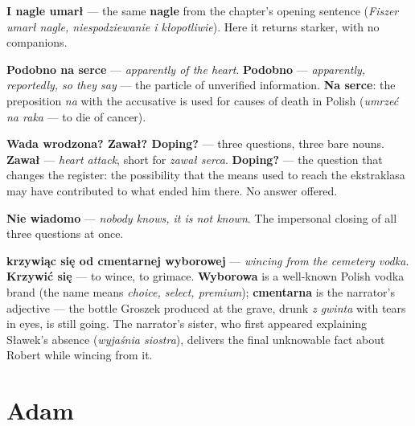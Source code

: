 

\textbf{I nagle umarł} --- the same \textbf{nagle} from the chapter's
opening sentence (\textit{Fiszer umarł nagle, niespodziewanie i
kłopotliwie}). Here it returns starker, with no companions.

\textbf{Podobno na serce} --- \textit{apparently of the heart}.
\textbf{Podobno} --- \textit{apparently, reportedly, so they say} ---
the particle of unverified information. \textbf{Na serce}: the
preposition \textit{na} with the accusative is used for causes of
death in Polish (\textit{umrzeć na raka} --- to die of cancer).

\textbf{Wada wrodzona? Zawał? Doping?} --- three questions, three
bare nouns. \textbf{Zawał} --- \textit{heart attack}, short for
\textit{zawał serca}. \textbf{Doping?} --- the question that changes
the register: the possibility that the means used to reach the
ekstraklasa may have contributed to what ended him there. No answer
offered.

\textbf{Nie wiadomo} --- \textit{nobody knows, it is not known}. The
impersonal closing of all three questions at once.

\textbf{krzywiąc się od cmentarnej wyborowej} --- \textit{wincing
from the cemetery vodka}. \textbf{Krzywić się} --- to wince, to
grimace. \textbf{Wyborowa} is a well-known Polish vodka brand (the
name means \textit{choice, select, premium}); \textbf{cmentarna} is
the narrator's adjective --- the bottle Groszek produced at the grave,
drunk \textit{z gwinta} with tears in eyes, is still going. The
narrator's sister, who first appeared explaining Sławek's absence
(\textit{wyjaśnia siostra}), delivers the final unknowable fact about
Robert while wincing from it.

\section{Adam}


